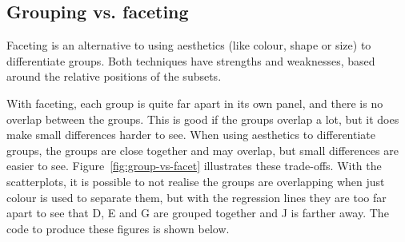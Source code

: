 % 

\subsection{Grouping vs. faceting}
\label{sub:group-vs-facet}

Faceting is an alternative to using aesthetics (like colour, shape or size) to differentiate groups. Both techniques have strengths and weaknesses, based around the relative positions of the subsets. 

With faceting, each group is quite far apart in its own panel, and there is no overlap between the groups.  This is good if the groups overlap a lot, but it does make small differences harder to see.  When using aesthetics to differentiate groups, the groups are close together and may overlap, but small differences are easier to see.  Figure~\ref{fig:group-vs-facet} illustrates these trade-offs.  With the scatterplots, it is possible to not realise the groups are overlapping when just colour is used to separate them, but with the regression lines they are too far apart to see that D, E and G are grouped together and J is farther away.  The code to produce these figures is shown below.

% 
%
% 


